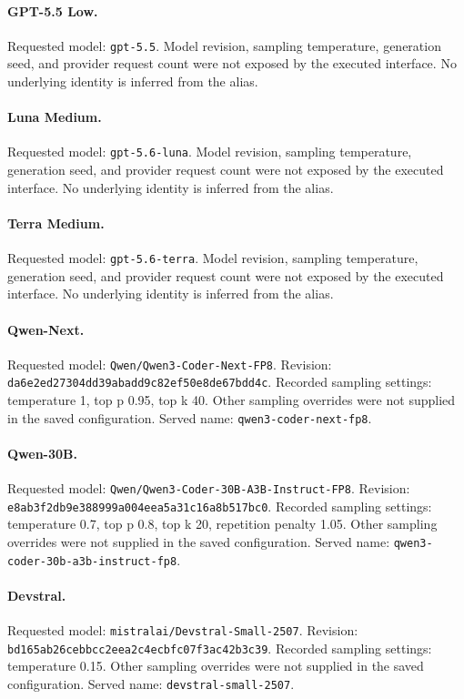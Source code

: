 \paragraph{GPT-5.5 Low.} Requested model: \nolinkurl{gpt-5.5}.
Model revision, sampling temperature, generation seed, and provider request count were not exposed by the executed interface. No underlying identity is inferred from the alias.
\paragraph{Luna Medium.} Requested model: \nolinkurl{gpt-5.6-luna}.
Model revision, sampling temperature, generation seed, and provider request count were not exposed by the executed interface. No underlying identity is inferred from the alias.
\paragraph{Terra Medium.} Requested model: \nolinkurl{gpt-5.6-terra}.
Model revision, sampling temperature, generation seed, and provider request count were not exposed by the executed interface. No underlying identity is inferred from the alias.
\paragraph{Qwen-Next.} Requested model: \nolinkurl{Qwen/Qwen3-Coder-Next-FP8}.
Revision: {\footnotesize\texttt{da6e2ed27304dd39abadd9c82ef50e8de67bdd4c}}.
Recorded sampling settings: temperature 1, top p 0.95, top k 40. Other sampling overrides were not supplied in the saved configuration. Served name: \nolinkurl{qwen3-coder-next-fp8}.
\paragraph{Qwen-30B.} Requested model: \nolinkurl{Qwen/Qwen3-Coder-30B-A3B-Instruct-FP8}.
Revision: {\footnotesize\texttt{e8ab3f2db9e388999a004eea5a31c16a8b517bc0}}.
Recorded sampling settings: temperature 0.7, top p 0.8, top k 20, repetition penalty 1.05. Other sampling overrides were not supplied in the saved configuration. Served name: \nolinkurl{qwen3-coder-30b-a3b-instruct-fp8}.
\paragraph{Devstral.} Requested model: \nolinkurl{mistralai/Devstral-Small-2507}.
Revision: {\footnotesize\texttt{bd165ab26cebbcc2eea2c4ecbfc07f3ac42b3c39}}.
Recorded sampling settings: temperature 0.15. Other sampling overrides were not supplied in the saved configuration. Served name: \nolinkurl{devstral-small-2507}.

